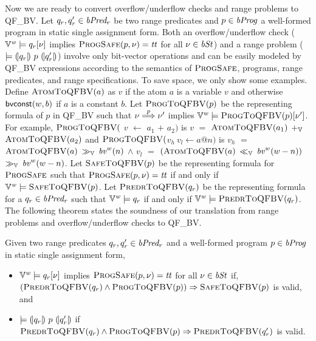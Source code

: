 Now we are ready to convert overflow/underflow checks and range problems to QF\_BV.
Let $q_r, q_r' \in \mathit{bPred_r}$ be two range predicates and $p \in \mathit{bProg}$ a well-formed program in static single assignment form.
Both an overflow/underflow check ($\mathbb{V}^{\mathit{w}} \models q_r[\nu]$ implies $\textsc{ProgSafe}(p, \nu) = \mathit{tt}$ for all $\nu \in \mathit{bSt}$) and a range problem ($\models {(\!|}{q_r}{|\!)}~{p}~{(\!|}{q_r'}{|\!)}$) involve only bit-vector operations and can be easily modeled by QF\_BV expressions according to the semantics of $\textsc{ProgSafe}$, programs, range predicates, and range specifications.
To save space, we only show some examples.
Define $\textsc{AtomToQFBV}(a)$ as $v$ if the atom $a$ is a variable $v$ and otherwise $\mbox{\textsf{bvconst}}(w, b)$ if $a$ is a constant $b$.
Let $\textsc{ProgToQFBV}(p)$ be the representing formula of $p$ in QF\_BV such that $\nu \overset{p}{\Longrightarrow} \nu'$ implies $\mathbb{V}^{\mathit{w}} \models \textsc{ProgToQFBV}(p)[\nu']$.
For example, $\textsc{ProgToQFBV}($ $v$ $\leftarrow$ $a_1$ $+$ $a_2)$ is $v$ $=$ $\textsc{AtomToQFBV}(a_1)$ $+_{\mathbb{V}}$ $\textsc{AtomToQFBV}(a_2)$ and $\textsc{ProgToQFBV}($$v_h\ v_l \leftarrow a @ n)$ is $v_h$ $=$ $\textsc{AtomToQFBV}(a)$ $\gg_{\mathbb{V}}$ $\mathit{bv}^w(n)$ $\wedge$ $v_l$ $=$ $(\textsc{AtomToQFBV}(a)$ $\ll_{\mathbb{V}}$ $\mathit{bv}^w(w - n))$ $\gg_{\mathbb{V}}$ $\mathit{bv}^w(w - n)$.
Let $\textsc{SafeToQFBV}(p)$ be the representing formula for $\textsc{ProgSafe}$ such that $\textsc{ProgSafe}(p, \nu) = \mathit{tt}$ if and only if $\mathbb{V}^{\mathit{w}} \models \textsc{SafeToQFBV}(p)$.
Let $\textsc{PredrToQFBV}(q_r)$ be the representing formula for a $q_r \in \mathit{bPred_r}$ such that $\mathbb{V}^{\mathit{w}} \models q_r$ if and only if $\mathbb{V}^{\mathit{w}} \models \textsc{PredrToQFBV}(q_r)$.
The following theorem states the soundness of our translation from range problems and overflow/underflow checks to QF\_BV.

\begin{theorem}
Given two range predicates $q_r, q_r' \in \mathit{bPred_r}$ and a well-formed program $p \in \mathit{bProg}$ in static single assignment form,
\begin{itemize}
\item $\mathbb{V}^{\mathit{w}} \models q_r[\nu]$ implies $\textsc{ProgSafe}(p, \nu) = \mathit{tt}$ for all $\nu \in \mathit{bSt}$ if, $(\textsc{PredrToQFBV}(q_r) \wedge \textsc{ProgToQFBV}(p)) \Rightarrow \textsc{SafeToQFBV}(p)$ is valid, and
\item $\models {(\!|}{q_r}{|\!)}~{p}~{(\!|}{q_r'}{|\!)}$ if $\textsc{PredrToQFBV}(q_r) \wedge \textsc{ProgToQFBV}(p) \Rightarrow \textsc{PredrToQFBV}(q_r')$ is valid.
\end{itemize}
\label{theorem:to-qfbv}
\end{theorem}






